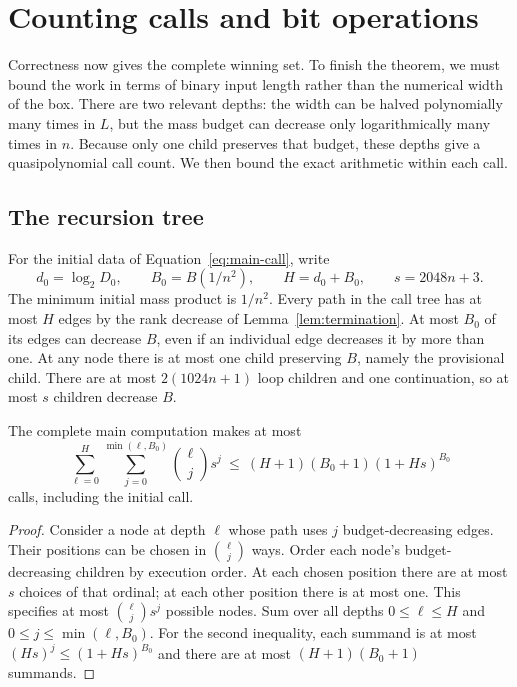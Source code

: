 \section{Counting calls and bit operations}
\label{sec:complexity}

Correctness now gives the complete winning set. To finish the theorem,
we must bound the work in terms of binary input length rather than the
numerical width of the box. There are two relevant depths: the width
can be halved polynomially many times in $L$, but the mass budget can
decrease only logarithmically many times in $n$. Because only one
child preserves that budget, these depths give a quasipolynomial call
count. We then bound the exact arithmetic within each call.

\subsection{The recursion tree}

For the initial data of Equation~\eqref{eq:main-call}, write
\begin{equation}
 d_0=\log_2 D_0,\qquad B_0=B(1/n^2),\qquad
 H=d_0+B_0,\qquad s=2048n+3.
 \label{eq:initial-resources}
\end{equation}
The minimum initial mass product is $1/n^2$. Every path in the call
tree has at most $H$ edges by the rank decrease of
Lemma~\ref{lem:termination}. At most $B_0$ of its edges can
decrease $B$, even if an individual edge decreases it by more than
one. At any node there is at most one child preserving $B$,
namely the provisional child. There are at most $2(1024n+1)$ loop
children and one continuation, so at most $s$ children decrease $B$.

\begin{lemma}
\label{lem:node-count}
The complete main computation makes at most
\begin{equation}
 \sum_{\ell=0}^{H}\sum_{j=0}^{\min(\ell,B_0)}
       \binom{\ell}{j}s^j
 \ \le\ (H+1)(B_0+1)(1+Hs)^{B_0}
 \label{eq:node-bound}
\end{equation}
calls, including the initial call.
\end{lemma}

\begin{proof}
Consider a node at depth $\ell$ whose path uses $j$ budget-decreasing
edges. Their positions can be chosen in $\binom{\ell}{j}$ ways.
Order each node's budget-decreasing children by execution order.
At each chosen position there are at most $s$ choices of that ordinal; at each
other position there is at most one. This specifies at most
$\binom{\ell}{j}s^j$ possible nodes. Sum over all depths
$0\le\ell\le H$ and $0\le j\le\min(\ell,B_0)$.
For the second inequality, each summand is at most
$(Hs)^j\le(1+Hs)^{B_0}$ and there are at most
$(H+1)(B_0+1)$ summands.
\end{proof}

